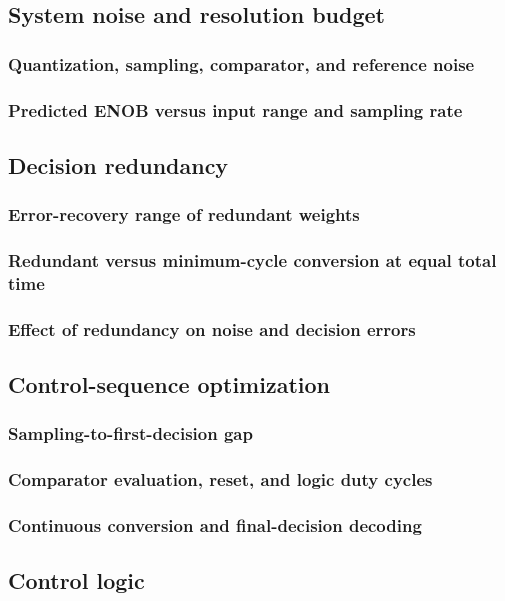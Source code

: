 \documentclass[PhD, UKenglish]{scrbook}
\begin{document}
\subsection{System noise and resolution budget}
\subsubsection{Quantization, sampling, comparator, and reference noise}
\subsubsection{Predicted ENOB versus input range and sampling rate}
\clearpage
\subsection{Decision redundancy}
\subsubsection{Error-recovery range of redundant weights}
\subsubsection{Redundant versus minimum-cycle conversion at equal total time}
\subsubsection{Effect of redundancy on noise and decision errors}
\subsection{Control-sequence optimization}
\subsubsection{Sampling-to-first-decision gap}
\subsubsection{Comparator evaluation, reset, and logic duty cycles}
\subsubsection{Continuous conversion and final-decision decoding}
\subsection{Control logic}
\end{document}
